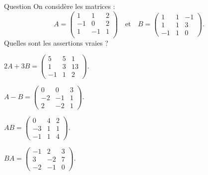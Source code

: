 \begin{multi}[multiple,feedback=
{On a : 
\(A-B= \left(\begin{array}{rcc}
0&0&3\\
-2&-1&-1\\
2&-2&1\end{array}\right) \quad \) et 
\( \quad AB=  \left(\begin{array}{rcc}
0&4&2\\ -3&1&1\\
-1&1&-4\end{array}\right).\)
}]{Question}
On considère les matrices : 
\[A=  
\left(\begin{array}{rcc}
1&1&2\\
-1&0&2\\
1&-1&1\\
\end{array}\right) \quad \mbox{et} \quad 
B=    
\left(\begin{array}{rcc}
1&1&-1\\
1&1&3\\
-1&1&0\end{array}\right). \]
Quelles sont les assertions vraies ?

    \item* \(2A+3B=
\left(\begin{array}{rcc}
5&5&1\\
1&3&13\\
-1&1&2\end{array}\right).\)
    \item \(A-B=
\left(\begin{array}{rcc}
0&0&3\\
-2&-1&1\\
2&-2&1\end{array}\right).\)
    \item \(AB=
\left(\begin{array}{rcc}
0&4&2\\
-3&1&1\\-1&1&4\end{array}\right).\)
    \item* \(BA=
\left(\begin{array}{rcc}
-1&2&3\\
3&-2&7\\-2&-1&0\end{array}\right).\)
\end{multi}


